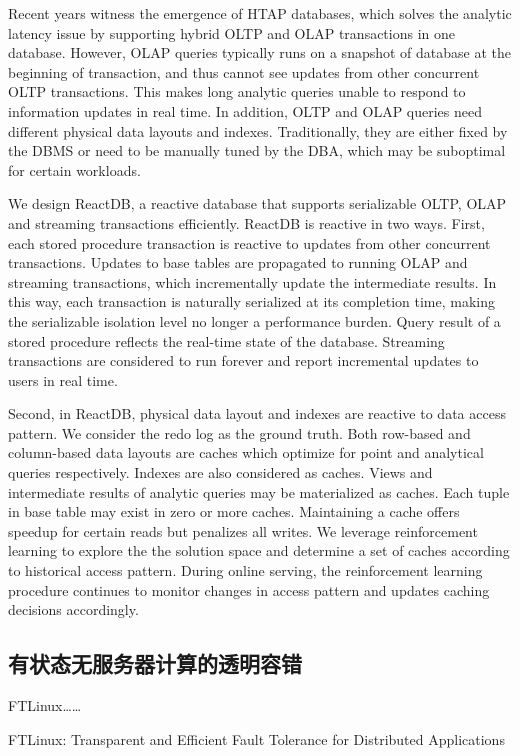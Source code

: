 Recent years witness the emergence of HTAP databases, which solves the analytic latency issue by supporting hybrid OLTP and OLAP transactions in one database. However, OLAP queries typically runs on a snapshot of database at the beginning of transaction, and thus cannot see updates from other concurrent OLTP transactions. This makes long analytic queries unable to respond to information updates in real time. In addition, OLTP and OLAP queries need different physical data layouts and indexes. Traditionally, they are either fixed by the DBMS or need to be manually tuned by the DBA, which may be suboptimal for certain workloads.

We design ReactDB, a reactive database that supports serializable OLTP, OLAP and streaming transactions efficiently. ReactDB is reactive in two ways. First, each stored procedure transaction is reactive to updates from other concurrent transactions. Updates to base tables are propagated to running OLAP and streaming transactions, which incrementally update the intermediate results. In this way, each transaction is naturally serialized at its completion time, making the serializable isolation level no longer a performance burden. Query result of a stored procedure reflects the real-time state of the database. Streaming transactions are considered to run forever and report incremental updates to users in real time.

Second, in ReactDB, physical data layout and indexes are reactive to data access pattern. We consider the redo log as the ground truth. Both row-based and column-based data layouts are caches which optimize for point and analytical queries respectively. Indexes are also considered as caches. Views and intermediate results of analytic queries may be materialized as caches. Each tuple in base table may exist in zero or more caches. Maintaining a cache offers speedup for certain reads but penalizes all writes. We leverage reinforcement learning to explore the the solution space and determine a set of caches according to historical access pattern. During online serving, the reinforcement learning procedure continues to monitor changes in access pattern and updates caching decisions accordingly.


\subsection{有状态无服务器计算的透明容错}

FTLinux……

FTLinux: Transparent and Efficient Fault Tolerance for Distributed Applications

